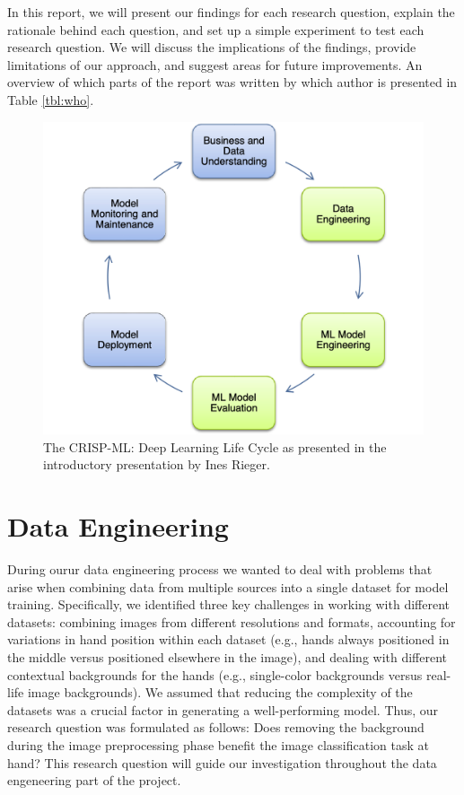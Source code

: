 \documentclass[a4paper]{article}
\begin{document}
In this report, we will present our findings for each research question, explain the rationale behind each question, and set up a simple experiment to test each research question. We will discuss the implications of the findings, provide limitations of our approach, and suggest areas for future improvements. An overview of which parts of the report was written by which author is presented in Table \ref{tbl:who}.

\begin{figure}
       \centering
      \includegraphics[width=.5\textwidth]{img/crisp.png}
       \caption{The CRISP-ML: Deep Learning Life Cycle as presented in the introductory presentation by Ines Rieger.}
       \label{fig:crisp}
   \end{figure} 

\section{Data Engineering}
During ourur data engineering process we wanted to deal with problems that arise when combining data from multiple sources into a single dataset for model training. Specifically, we identified three key challenges in working with different datasets: combining images from different resolutions and formats, accounting for variations in hand position within each dataset (e.g., hands always positioned in the middle versus positioned elsewhere in the image), and dealing with different contextual backgrounds for the hands (e.g., single-color backgrounds versus real-life image backgrounds). We assumed that reducing the complexity of the datasets was a crucial factor in generating a well-performing model. Thus, our research question was formulated as follows: Does removing the background during the image preprocessing phase benefit the image classification task at hand? This research question will guide our investigation throughout the data engeneering part of the project.
\end{document}
